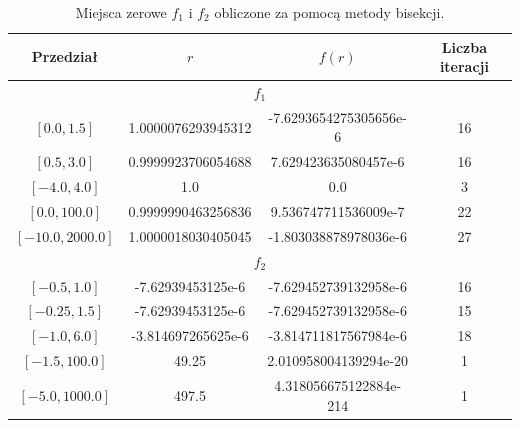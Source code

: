 \documentclass[10pt,a4paper, polish]{article}
\begin{document}
\begin{table}[H]
        \centering
        \footnotesize
\begin{tabular}{c|c|c|c}
Przedział& {$r$} & {$f(r)$} & Liczba iteracji \\ \hline
\multicolumn{4}{c}{$f_1$} \\ \hline
$[0.0,1.5]$&1.0000076293945312&-7.6293654275305656e-6&16 \\
$[0.5,3.0]$&0.9999923706054688&7.629423635080457e-6&16 \\
$[-4.0,4.0]$&1.0&0.0&3 \\
$[0.0,100.0]$&0.9999990463256836&9.536747711536009e-7&22 \\
$[-10.0,2000.0]$&1.0000018030405045&-1.803038878978036e-6&27 \\ \hline
\multicolumn{4}{c}{$f_2$} \\ \hline
$[-0.5,1.0]$&-7.62939453125e-6&-7.629452739132958e-6&16 \\
$[-0.25,1.5]$&-7.62939453125e-6&-7.629452739132958e-6&15 \\
$[-1.0,6.0]$&-3.814697265625e-6&-3.814711817567984e-6&18 \\
$[-1.5,100.0]$&49.25&2.010958004139294e-20&1 \\
$[-5.0,1000.0]$&497.5&4.318056675122884e-214&1 \\
\end{tabular}
\caption{Miejsca zerowe $f_1$ i $f_2$ obliczone za pomocą metody bisekcji.}
\label{table:3}
\end{table}
\end{document}
